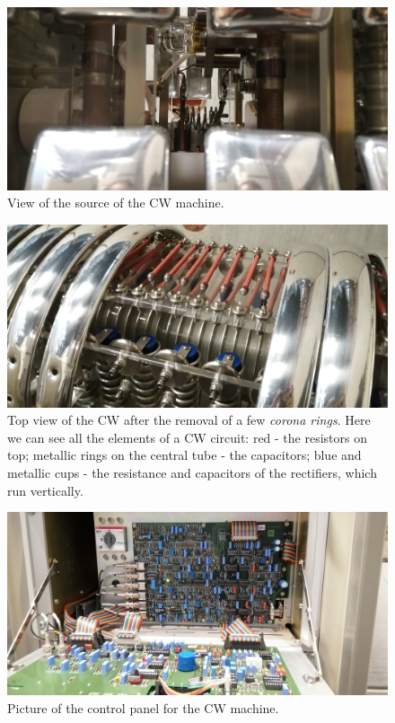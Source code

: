 \begin{refsection}
        \begin{figure}
            \centering
            \includegraphics[width=1\textwidth]{Figures/MEG/CW/view_source.jpg}
            \caption[CW: source picture]{View of the source of the CW   machine.}
            \label{fig:CW:view_source}
        \end{figure}

        \begin{figure}
            \centering
            \includegraphics[width=1\textwidth]{Figures/MEG/CW/view_top.jpg}
            \caption[CW: picture after removing corona rings]{Top view of the CW after the removal of a few \textit{corona rings}. Here we can see all the elements of a CW circuit: red - the resistors on top; metallic rings on the central tube - the capacitors; blue and metallic cups - the resistance and capacitors of the rectifiers, which run vertically.}
            \label{fig:CW:view_top}
        \end{figure}

        \begin{figure}
            \centering
            \includegraphics[width=1\textwidth]{Figures/MEG/CW/panel.jpg}
            \caption[CW: control panel]{Picture of the control panel for the CW machine.}
            \label{fig:CW:panel}
        \end{figure}


\end{refsection}
